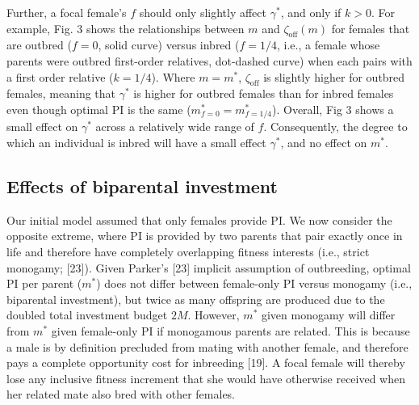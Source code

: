 \documentclass[12pt]{article}
\begin{document}
Further, a focal female's $f$ should only slightly affect $\gamma^{*}$, and only if $k>0$. For example, Fig. 3 shows the relationships between $m$ and $\zeta_{\textrm{off}}(m)$ for females that are outbred ($f=0$, solid curve) versus inbred ($f=1/4$, i.e., a female whose parents were outbred first-order relatives, dot-dashed curve) when each pairs with a first order relative ($k=1/4$). Where $m=m^{*}$, $\zeta_{\textrm{off}}$ is slightly higher for outbred females, meaning that $\gamma^{*}$ is higher for outbred females than for inbred females even though optimal PI is the same ($m^{*}_{f=0}=m^{*}_{f=1/4}$). Overall, Fig 3 shows a small effect on $\gamma^{*}$ across a relatively wide range of $f$. Consequently, the degree to which an individual is inbred will have a small effect $\gamma^{*}$, and no effect on $m^{*}$.

\subsection*{Effects of biparental investment}

Our initial model assumed that only females provide PI. We now consider the opposite extreme, where PI is provided by two parents that pair exactly once in life and therefore have completely overlapping fitness interests (i.e., strict monogamy; [23]). Given Parker's [23] implicit assumption of outbreeding, optimal PI per parent ($m^{*}$) does not differ between female-only PI versus monogamy (i.e., biparental investment), but twice as many offspring are produced due to the doubled total investment budget $2M$. However, $m^{*}$ given monogamy will differ from $m^{*}$ given female-only PI if monogamous parents are related. This is because a male is by definition precluded from mating with another female, and therefore pays a complete opportunity cost for inbreeding [19]. A focal female will thereby lose any inclusive fitness increment that she would have otherwise received when her related mate also bred with other females. 
\end{document}

